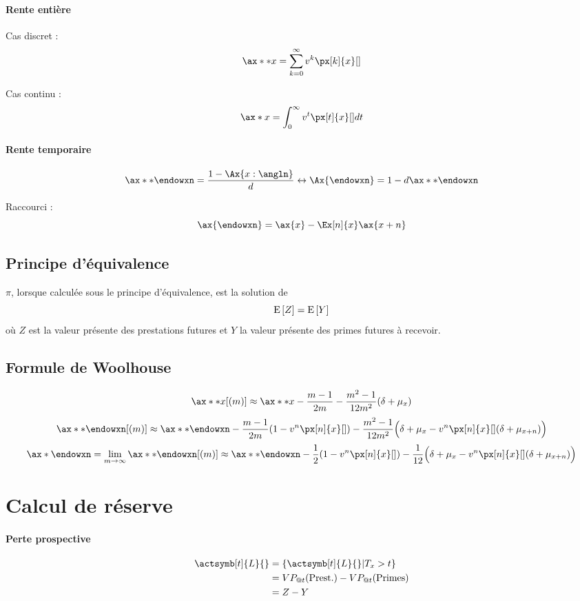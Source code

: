 \documentclass[10pt, french]{article}
\begin{document}
\begin{multicols*}{2}
\paragraph{Rente entière} Cas discret : 
\[\ax**{x} = \sum_{k=0}^{\infty} v^{k} \px[k]{x}[]  \]

Cas continu : 
\[\ax*{x} = \int_{0}^{\infty}  v^t \px[t]{x}[] dt \]

\paragraph{Rente temporaire}
\[\ax**{\endowxn} = \frac{1 - \Ax{x:\angln}}{d} \leftrightarrow \Ax{\endowxn} =1 - d \ax**{\endowxn}\]

Raccourci : 
\[\ax{\endowxn} = \ax{x} - \Ex[n]{x} \ax{x+n}  \]




\subsection*{Principe d'équivalence}
$\pi$, lorsque calculée sous le principe d'équivalence, est la solution de
\[\mathrm{E} \left[ Z \right] = \mathrm{E} \left[ Y \right]\]
où $Z$ est la valeur présente des prestations futures et $Y$ la valeur présente des primes futures à recevoir.

\subsection*{Formule de Woolhouse}
\[\ax**{x}[(m)] \approx \ax**{x} - \frac{m-1}{2m} - \frac{m^2 -1}{12m^2} (\delta + \mu_x)  \]
\[\ax**{\endowxn}[(m)] \approx  \ax**{\endowxn} - \frac{m-1}{2m}(1  -v^n \px[n]{x}[]) - \frac{m^2 -1}{12m^2} \Big( \delta + \mu_x - v^n \px[n]{x}[](\delta + \mu_{x+n}) \Big)  \]
\[\ax*{\endowxn} = \lim_{m \to \infty}  \ax**{\endowxn}[(m)] \approx  \ax**{\endowxn} - \frac{1}{2} (1  -v^n \px[n]{x}[]) - \frac{1}{12} \Big( \delta + \mu_x - v^n \px[n]{x}[](\delta + \mu_{x+n}) \Big)  \]



\section{Calcul de réserve}
\paragraph{Perte prospective}
\begin{align*}
\actsymb[t]{L}{} & = \{ \actsymb[t]{L}{} | T_x > t \} \\
& = VP_{@t}(\text{Prest.}) - VP_{@t}(\text{Primes}) \\
& = Z - Y
\end{align*}


\end{multicols*}
\end{document}
